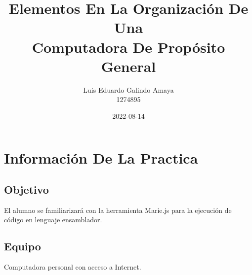 \documentclass[12pt]{article}
\author{Luis Eduardo Galindo Amaya \\
1274895}
\date{2022-08-14}
\title{Elementos En La Organización De Una \\
Computadora De Propósito General}
\newcommand{\tagline}{Práctica 1}
\newcommand{\asignatura}{Arquitectura de Computadoras (331)}
\newcommand{\docente}{Arturo Arreola Alvarez}
\begin{document}

\setlength\parindent{0pt} 

\section*{Información De La Practica}
\label{sec:org36a5492}

\subsection*{Objetivo}
\label{sec:org8cb286c}
El alumno se familiarizará con la herramienta Marie.js para la ejecución de código en lenguaje ensamblador.

\subsection*{Equipo}
\label{sec:orgccacf9b}
Computadora personal con acceso a Internet.
\end{document}
